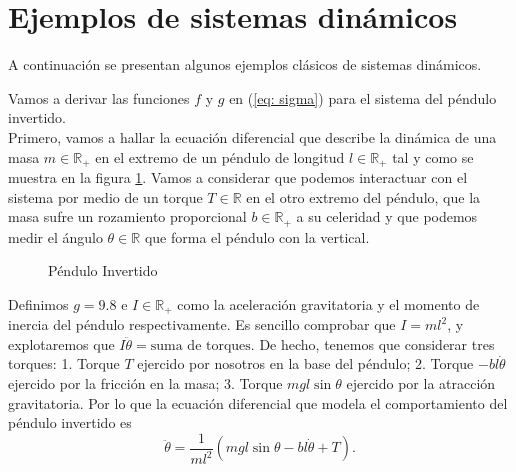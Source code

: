 \section{Ejemplos de sistemas dinámicos}\label{sec: ejem}
A continuación se presentan algunos ejemplos clásicos de sistemas dinámicos.
\begin{example}

Vamos a derivar las funciones $f$ y $g$ en (\ref{eq: sigma}) para el sistema del péndulo invertido.\\

Primero, vamos a hallar la ecuación diferencial que describe la dinámica de una masa $m\in\mathbb{R}_+$ en el extremo de un péndulo de longitud $l\in\mathbb{R}_+$ tal y como se muestra en la figura \ref{fig: invpen}. Vamos a considerar que podemos interactuar con el sistema por medio de un torque $T\in\mathbb{R}$ en el otro extremo del péndulo, que la masa sufre un rozamiento proporcional $b\in\mathbb{R}_+$ a su celeridad y que podemos medir el ángulo $\theta\in\mathbb{R}$ que forma el péndulo con la vertical.

\begin{figure}[!ht]
\centering
{}
\caption{Péndulo Invertido}
\label{fig: invpen}
\end{figure}

Definimos $g = 9.8$ e $I\in\mathbb{R}_+$ como la aceleración gravitatoria y el momento de inercia del péndulo respectivamente. Es sencillo comprobar que $I = ml^2$, y explotaremos que $I \ddot\theta = \text{suma de torques}$. De hecho, tenemos que considerar tres torques: 1. Torque $T$ ejercido por nosotros en la base del péndulo; 2. Torque $-bl\dot\theta$ ejercido por la fricción en la masa; 3. Torque $mgl \sin\theta$ ejercido por la atracción gravitatoria. Por lo que la ecuación diferencial que modela el comportamiento del péndulo invertido es
\begin{equation}
\ddot\theta = \frac{1}{ml^2}\left(mgl\sin{\theta}-bl\dot\theta + T\right).
\label{eq: dyn}
\end{equation}


\end{example}
